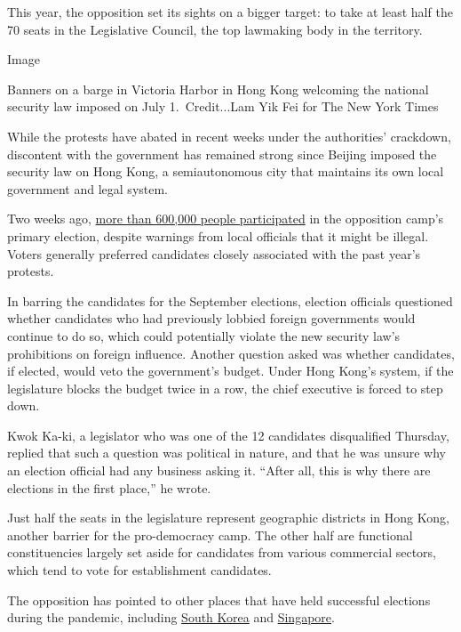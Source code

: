 This year, the opposition set its sights on a bigger target: to take at
least half the 70 seats in the Legislative Council, the top lawmaking
body in the territory.

Image

Banners on a barge in Victoria Harbor in Hong Kong welcoming the
national security law imposed on July 1.~Credit...Lam Yik Fei for The
New York Times

While the protests have abated in recent weeks under the authorities'
crackdown, discontent with the government has remained strong since
Beijing imposed the security law on Hong Kong, a semiautonomous city
that maintains its own local government and legal system.

Two weeks ago,
\href{https://www.nytimes3xbfgragh.onion/2020/07/13/world/asia/hong-kong-elections-security.html}{more
than 600,000 people participated} in the opposition camp's primary
election, despite warnings from local officials that it might be
illegal. Voters generally preferred candidates closely associated with
the past year's protests.

In barring the candidates for the September elections, election
officials questioned whether candidates who had previously lobbied
foreign governments would continue to do so, which could potentially
violate the new security law's prohibitions on foreign influence.
Another question asked was whether candidates, if elected, would veto
the government's budget. Under Hong Kong's system, if the legislature
blocks the budget twice in a row, the chief executive is forced to step
down.

Kwok Ka-ki, a legislator who was one of the 12 candidates disqualified
Thursday, replied that such a question was political in nature, and that
he was unsure why an election official had any business asking it.
``After all, this is why there are elections in the first place,'' he
wrote.

Just half the seats in the legislature represent geographic districts in
Hong Kong, another barrier for the pro-democracy camp. The other half
are functional constituencies largely set aside for candidates from
various commercial sectors, which tend to vote for establishment
candidates.

The opposition has pointed to other places that have held successful
elections during the pandemic, including
\href{https://www.nytimes3xbfgragh.onion/2020/04/10/world/asia/coronavirus-south-korea-election.html}{South
Korea} and
\href{https://www.nytimes3xbfgragh.onion/2020/07/10/world/asia/singapore-election-results.html}{Singapore}.

